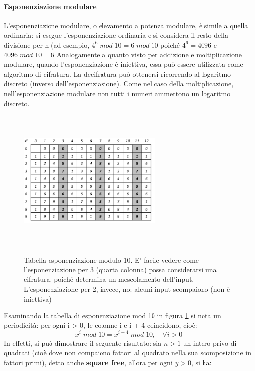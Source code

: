 \paragraph{Esponenziazione modulare}
L'esponenziazione modulare, o elevamento a potenza modulare, è simile a quella ordinaria: si esegue l'esponenziazione ordinaria e si considera il resto della divisione per n (ad esempio, $4^6 \; mod \; 10 = 6 \; mod \; 10$ poiché $4^6 = 4096$ e $4096 \; mod \; 10 = 6$
\newline \newline 
Analogamente a quanto visto per addizione e moltiplicazione modulare, quando l'esponenziazione è iniettiva, essa può essere utilizzata come algoritmo di cifratura. La decifratura può ottenersi ricorrendo al logaritmo discreto
(inverso dell'esponenziazione). Come nel caso della moltiplicazione, nell'esponenziazione modulare non tutti i numeri ammettono un logaritmo discreto.
\begin{figure}[htbp]
	\centering%
	\subfigure%
	{\includegraphics[height=7cm, width=7cm, keepaspectratio]{Immagini/chiave_pubblica/exp_mod.png}}
	\caption{Tabella esponenziazione modulo 10. E' facile vedere come l'esponenziazione per 3 (quarta colonna) possa considerarsi una cifratura, poiché determina un mescolamento dell'input. L'esponenziazione per 2, invece, no: alcuni input scompaiono (non è iniettiva) \label{fig:exp_mod}} 	
\end{figure}
\newline \newline
Esaminando la tabella di esponenziazione mod 10 in figura \ref{fig:exp_mod} si nota un periodicità: per ogni i > 0, le colonne i e i + 4 coincidono, cioè:
\begin{equation}
x^i \; mod \; 10 = x^{i + 4} \; mod \; 10, \quad \forall i>0
\end{equation}
In effetti, si può dimostrare il seguente risultato: sia $n > 1$ un intero privo di quadrati (cioè dove non compaiono fattori al quadrato nella sua scomposizione in fattori primi), detto anche \textbf{square free}, allora per ogni $y > 0$, si ha: 
